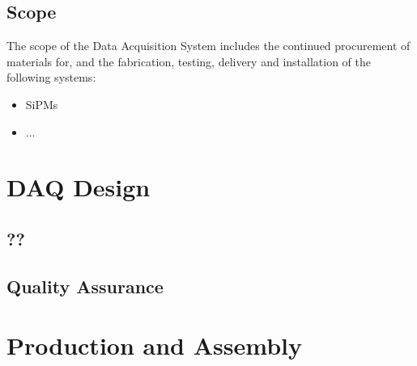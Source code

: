 

\subsection{Scope}
\label{sec:fdsp-daq-scope}

The scope of the Data Acquisition System includes the continued procurement of materials for, and the fabrication, testing, delivery and installation of the following systems: 


\begin{itemize}
\item SiPMs 
\item  ...
\end{itemize}



\section{DAQ Design}
\label{sec:fdsp-daq-design}




\subsection{??}
\label{sec:fdsp-daq-??}

\subsection{Quality Assurance}
\label{sec:fdsp-daq-qa}




\section{Production and Assembly}
\label{sec:fdsp-daq-prod-assy}

